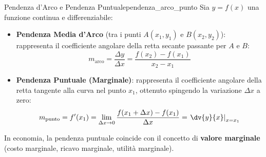 \begin{definizione}{Pendenza d'Arco e Pendenza Puntuale}{pendenza_arco_punto}
Sia $y = f(x)$ una funzione continua e differenziabile:
\begin{itemize}
    \item \textbf{Pendenza Media d'Arco} (tra i punti $A(x_1, y_1)$ e $B(x_2, y_2)$): rappresenta il coefficiente angolare della retta secante passante per $A$ e $B$:
    \begin{equation}
        m_{\text{arco}} = \frac{\Delta y}{\Delta x} = \frac{f(x_2) - f(x_1)}{x_2 - x_1}
    \end{equation}
    \item \textbf{Pendenza Puntuale (Marginale)}: rappresenta il coefficiente angolare della retta tangente alla curva nel punto $x_1$, ottenuto spingendo la variazione $\Delta x$ a zero:
    \begin{equation}
        m_{\text{punto}} = f'(x_1) = \lim_{\Delta x \to 0} \frac{f(x_1 + \Delta x) - f(x_1)}{\Delta x} = \left. \dv{y}{x} \right|_{x = x_1}
    \end{equation}
\end{itemize}
In economia, la pendenza puntuale coincide con il concetto di \textbf{valore marginale} (costo marginale, ricavo marginale, utilità marginale).
\end{definizione}

